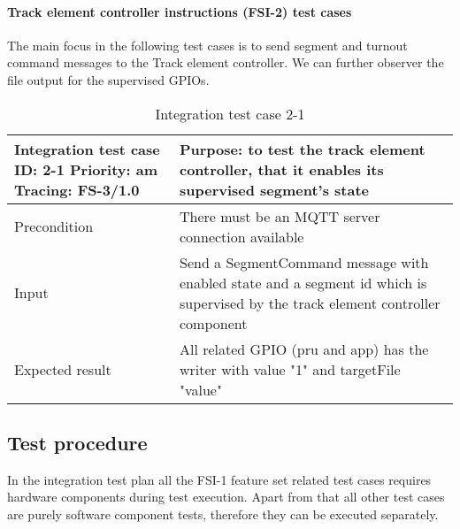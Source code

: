 \paragraph{Track element controller instructions (FSI-2) test cases}\label{p:TEC-ITC} The main focus in the following test cases is to send segment and turnout command messages to the Track element controller. We can further observer the file output for the supervised GPIOs.
\begin{table}[H]
	\caption{Integration test case 2-1}
	\label{table:TCase-FSI2-01}
	\begin{center}
		\renewcommand{\arraystretch}{1.8}
		\begin{tabu} 
			to 0.9 \textwidth
			{  X[0.4, c] X[c] }
			\toprule
			Integration test case ID: 2-1 \newline Priority: am \newline Tracing: FS-3/1.0 & Purpose: to test the track element controller, that it enables its supervised segment's state                                   \\ \midrule
			Precondition                                                                   & There must be an MQTT server connection available                                                                               \\
			Input                                                                          & Send a SegmentCommand message with enabled state and a segment id which is supervised by the track element controller component \\
			Expected result                                                                & All related GPIO (pru and app) has the writer with value "1" and targetFile "value"                                             \\ \bottomrule
		\end{tabu}
	\end{center}
\end{table} 
\subsection{Test procedure} 
In the integration test plan all the FSI-1 feature set related test cases requires hardware components during test execution. Apart from that all other test cases are purely software component tests, therefore they can be executed separately.



